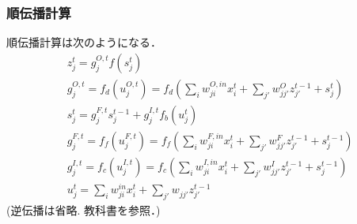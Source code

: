 \documentclass[dvipdfmx]{beamer}
\newcommand{\g}[2]{g_{#1}^{#2}}
\newcommand{\s}[2]{s_{#1}^{#2}}
\renewcommand{\u}[2]{u_{#1}^{#2}}
\newcommand{\w}[2]{w_{#1}^{#2}}
\newcommand{\x}[2]{x_{#1}^{#2}}
\newcommand{\z}[2]{z_{#1}^{#2}}
\begin{document}
\begin{frame}
    \frametitle{順伝播計算}
    順伝播計算は次のようになる．
    \begin{align*}
        &\z{j}{t} = \g{j}{O,t} f(\s{j}{t}) \\
        &\g{j}{O,t} = f_d(\u{j}{O,t})
                   = f_d \left(\sum_{i} \w{ji}{O,in} \x{i}{t} + \sum_{j'} \w{jj'}{O} \z{j'}{t-1} + \s{j}{t} \right) \\
        &\s{j}{t} = \g{j}{F,t} \s{j}{t-1} + \g{j}{I,t} f_b(\u{j}{t}) \\
        &\g{j}{F,t} = f_f(\u{j}{F,t})
                    = f_f \left( \sum_{i} \w{ji}{F,in} \x{i}{t} + \sum_{j'} \w{jj'}{F} \z{j'}{t-1} + \s{j}{t-1} \right) \\
        &\g{j}{I,t} = f_c(\u{j}{I,t})
                    = f_c \left( \sum_{i} \w{ji}{I,in} \x{i}{t} + \sum_{j'} \w{jj'}{I} \z{j'}{t-1} + \s{j}{t-1} \right) \\
        &\u{j}{t} = \sum_{i} \w{ji}{in} \x{i}{t} + \sum_{j'} \w{jj'}{} \z{j'}{t-1}
    \end{align*}
    (逆伝播は省略. 教科書\cite{blue}を参照．)
\end{frame}
\end{document}
